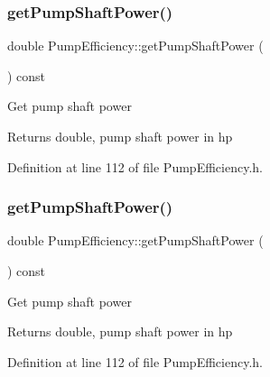 \subsubsection{\texorpdfstring{get\+Pump\+Shaft\+Power()}{getPumpShaftPower()}\hspace{0.1cm}{\footnotesize\ttfamily [1/3]}}
{\footnotesize\ttfamily double Pump\+Efficiency\+::get\+Pump\+Shaft\+Power (\begin{DoxyParamCaption}{ }\end{DoxyParamCaption}) const\hspace{0.3cm}{\ttfamily [inline]}}

Get pump shaft power

\begin{DoxyReturn}{Returns}
double, pump shaft power in hp 
\end{DoxyReturn}


Definition at line 112 of file Pump\+Efficiency.\+h.

\mbox{\label{class_pump_efficiency_aeb6d4f2cce565fbe834d71c7a52b87d1}} 
\subsubsection{\texorpdfstring{get\+Pump\+Shaft\+Power()}{getPumpShaftPower()}\hspace{0.1cm}{\footnotesize\ttfamily [2/3]}}
{\footnotesize\ttfamily double Pump\+Efficiency\+::get\+Pump\+Shaft\+Power (\begin{DoxyParamCaption}{ }\end{DoxyParamCaption}) const\hspace{0.3cm}{\ttfamily [inline]}}

Get pump shaft power

\begin{DoxyReturn}{Returns}
double, pump shaft power in hp 
\end{DoxyReturn}


Definition at line 112 of file Pump\+Efficiency.\+h.

\mbox{\label{class_pump_efficiency_aeb6d4f2cce565fbe834d71c7a52b87d1}} 

